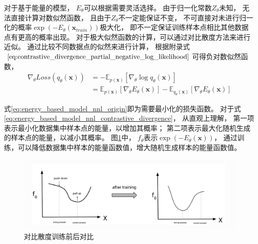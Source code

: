对于基于能量的模型，
{$E_{\theta}$}可以根据需要灵活选择。
由于归一化常数{$Z_{\theta}$}未知，
无法直接计算对数似然函数，
且由于{$Z_{\theta}$}不一定能保证不变，
不可直接对未进行归一化的概率{$\exp(-E_{\theta}(\bm{x}_{train}))$}极大化，
即不一定保证训练样本点相比其他数据点有更高的概率出现。
对于极大似然函数的计算，可以通过对比散度方法来进行近似。
通过比较不同数据点的似然来进行计算，
根据附录式{$\ref{eq:contrastive_divergence_partial_negative_log_likelihood}$}可得负对数似然函数，
\begin{align}
    \nabla _{\theta} Loss(q_{\theta}(\bm{x}))
    &= - \mathbb{E}_{p(\bm{x})}\left[ \nabla_{\theta} \log q_{\theta}(\bm{x}) \right] \label{eq:energy_based_model_nnl_origin} \\
    &= \mathbb{E}_{p(\bm{x})}\left[ \nabla_{\theta} E_{\theta}(\bm{x}) \right] - \mathbb{E}_{q_{\theta}(\bm{x})}\left[ \nabla_{\theta} E_{\theta}(\bm{x}) \right]  \label{eq:energy_based_model_nnl_contrastive_divergence}
\end{align}

式{\ref{eq:energy_based_model_nnl_origin}}即为需要最小化的损失函数。
对于式{\ref{eq:energy_based_model_nnl_contrastive_divergence}}，
从直观上理解，
第一项表示最小化数据集中样本点的能量，以增加其概率；
第二项表示最大化随机生成的样本点的能量，以减小其概率。
图{\ref{fig:energy_based_model_contrastive_divergence_training}}中，
{$f_{\theta}$}表示{$\exp (-E_{\theta}(\bm{x}))$}，
通过训练，可以降低数据集中样本的能量函数值，增大随机生成样本的能量函数值。
\begin{figure}[ht]
    \centering
    \includegraphics[width=1\textwidth]{figures/energy_based_model_contrastive_divergence_training}
    \caption{对比散度训练前后对比}\label{fig:energy_based_model_contrastive_divergence_training}
\end{figure}

